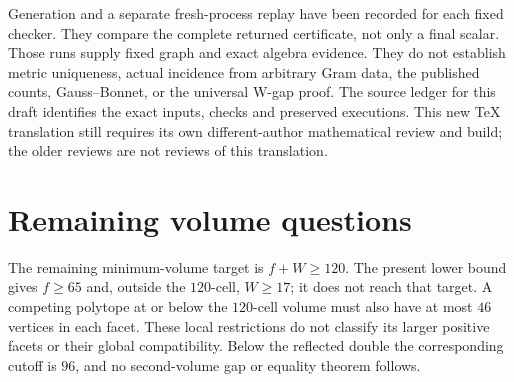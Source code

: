 \documentclass[11pt]{article}
\theoremstyle{remark}
\begin{document}
Generation and a separate fresh-process replay have been recorded for
each fixed checker. They compare the complete returned certificate,
not only a final scalar. Those runs supply fixed graph and exact
algebra evidence. They do not establish metric uniqueness, actual
incidence from arbitrary Gram data, the published counts, Gauss--Bonnet,
or the universal W-gap proof. The source ledger for this draft identifies
the exact inputs, checks and preserved executions. This new TeX translation
still requires its own different-author mathematical review and build;
the older reviews are not reviews of this translation.

\section{Remaining volume questions}

The remaining minimum-volume target is $f+W\ge120$. The present lower
bound gives $f\ge65$ and, outside the $120$-cell, $W\ge17$; it does
not reach that target. A competing polytope at or below the $120$-cell
volume must also have at most $46$ vertices in each facet. These local
restrictions do not classify its larger positive facets or their global
compatibility. Below the reflected double the corresponding cutoff is
$96$, and no second-volume gap or equality theorem follows.
\end{document}
